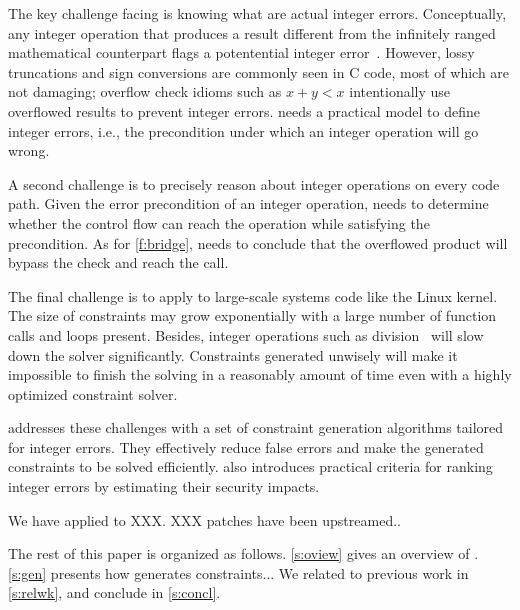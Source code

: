 The key challenge facing \sys is knowing what are actual integer
errors.  Conceptually, any integer operation that produces a result
different from the infinitely ranged mathematical counterpart flags
a potentential integer error~\cite{air}.  However, lossy truncations
and sign conversions are commonly seen in C code, most of which are
not damaging; overflow check idioms such as $x + y < x$ intentionally
use overflowed results to prevent integer errors.  \sys needs a
practical model to define integer errors, i.e., the precondition
under which an integer operation will go wrong.

A second challenge is to precisely reason about integer operations
on every code path.  Given the error precondition of an integer
operation, \sys needs to determine whether the control flow can
reach the operation while satisfying the precondition.  As for
\autoref{f:bridge}, \sys needs to conclude that the overflowed
product  will bypass the check and reach the 
call.

The final challenge is to apply \sys to large-scale systems code like
the Linux kernel.  The size of constraints may grow exponentially
with a large number of function calls and loops present.  Besides,
integer operations such as division~\cite{brummayer:perf} will slow
down the solver significantly.  Constraints generated unwisely will
make it impossible to finish the solving in a reasonably amount
of time even with a highly optimized constraint solver.

\sys addresses these challenges with a set of constraint generation
algorithms tailored for integer errors.  They effectively reduce
false errors and make the generated constraints to be solved
efficiently.  \sys also introduces practical criteria for ranking
integer errors by estimating their security impacts.

We have applied \sys to XXX.  XXX patches have been upstreamed..

The rest of this paper is organized as follows. \autoref{s:oview}
gives an overview of \sys.  \autoref{s:gen} presents how \sys
generates constraints...  We related \sys to previous work in
\autoref{s:relwk}, and conclude in \autoref{s:concl}.
